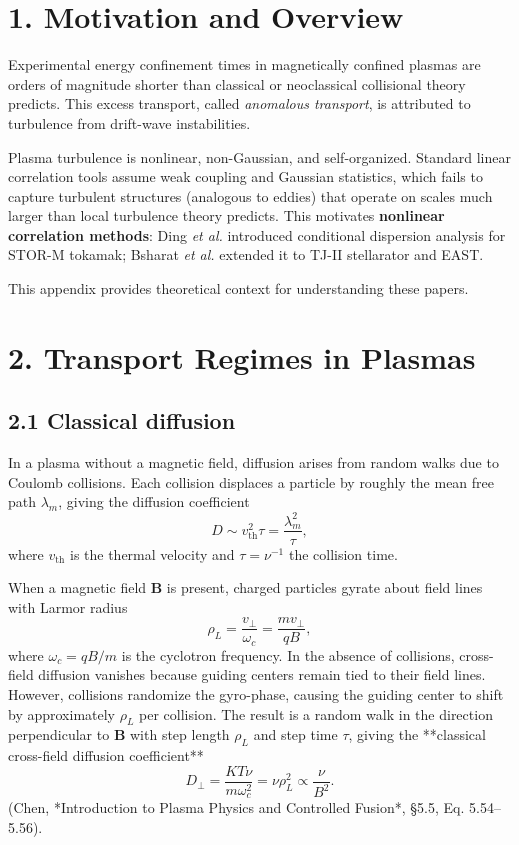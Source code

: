 \documentclass[11pt]{article}
\title{\coursename}
\author{
  \name \\[4pt]
  \normalsize Under the supervision of Dr.~C.~Xiao \\[-2pt]
  \normalsize \textit{Department of Physics and Engineering Physics, University of Saskatchewan}
}
\date{\dateissued}
\begin{document}
\maketitle

\section*{1. Motivation and Overview}

Experimental energy confinement times in magnetically confined plasmas are orders of magnitude shorter than classical or neoclassical collisional theory predicts. This excess transport, called \emph{anomalous transport}, is attributed to turbulence from drift-wave instabilities. 

Plasma turbulence is nonlinear, non-Gaussian, and self-organized. Standard linear correlation tools assume weak coupling and Gaussian statistics, which fails to capture turbulent structures (analogous to eddies) that operate on scales much larger than local turbulence theory predicts. This motivates \textbf{nonlinear correlation methods}: Ding \textit{et al.} \cite{dingNonlinearRadialCorrelation1997} introduced conditional dispersion analysis for STOR-M tokamak; Bsharat \textit{et al.} \cite{bsharatConditionalCrosscorrelationAnalysis2024} extended it to TJ-II stellarator and EAST.

This appendix provides theoretical context for understanding these papers.

\section*{2. Transport Regimes in Plasmas}

\subsection*{2.1 Classical diffusion}

In a plasma without a magnetic field, diffusion arises from random walks due to Coulomb collisions. 
Each collision displaces a particle by roughly the mean free path $\lambda_m$, giving the diffusion coefficient
\[
D \sim v_{\text{th}}^2 \tau = \frac{\lambda_m^2}{\tau},
\]
where $v_{\text{th}}$ is the thermal velocity and $\tau = \nu^{-1}$ the collision time. 

When a magnetic field $\mathbf{B}$ is present, charged particles gyrate about field lines with Larmor radius
\[
\rho_L = \frac{v_\perp}{\omega_c} = \frac{m v_\perp}{qB},
\]
where $\omega_c = qB/m$ is the cyclotron frequency. 
In the absence of collisions, cross-field diffusion vanishes because guiding centers remain tied to their field lines.  
However, collisions randomize the gyro-phase, causing the guiding center to shift by approximately $\rho_L$ per collision. 
The result is a random walk in the direction perpendicular to $\mathbf{B}$ with step length $\rho_L$ and step time $\tau$, giving the **classical cross-field diffusion coefficient**
\[
D_\perp = \frac{K T \nu}{m \omega_c^2}
        = \nu \rho_L^2
        \propto \frac{\nu}{B^2}.
\]
(Chen, *Introduction to Plasma Physics and Controlled Fusion*, §5.5, Eq. 5.54–5.56).  
\end{document}
